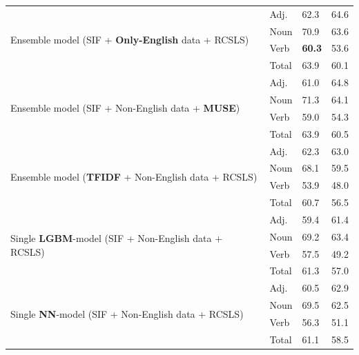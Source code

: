 \documentclass[11pt,a4paper]{article}
\begin{document}
\begin{table}[!htb]
\begin{tabular}{l l l l}
		\hline
		\multirow{4}{*}{Ensemble model (SIF + \textbf{Only-English} data + RCSLS)}
		& \multicolumn{1}{l}{Adj.} & \multicolumn{1}{l}{62.3} & \multicolumn{1}{l}{64.6} \\
		& \multicolumn{1}{l}{Noun} & \multicolumn{1}{l}{70.9} & \multicolumn{1}{l}{63.6} \\
		& \multicolumn{1}{l}{Verb} & \multicolumn{1}{l}{\textbf{60.3}} & \multicolumn{1}{l}{53.6} \\
		& \multicolumn{1}{l}{Total} & \multicolumn{1}{l}{63.9} & \multicolumn{1}{l}{60.1} \\
		\hline
		\multirow{4}{*}{Ensemble model (SIF + Non-English data + \textbf{MUSE})}
		& \multicolumn{1}{l}{Adj.} & \multicolumn{1}{l}{61.0} & \multicolumn{1}{l}{64.8} \\
		& \multicolumn{1}{l}{Noun} & \multicolumn{1}{l}{71.3} & \multicolumn{1}{l}{64.1} \\
		& \multicolumn{1}{l}{Verb} & \multicolumn{1}{l}{59.0} & \multicolumn{1}{l}{54.3} \\
		& \multicolumn{1}{l}{Total} & \multicolumn{1}{l}{63.9} & \multicolumn{1}{l}{60.5} \\
		\hline
		\multirow{4}{*}{Ensemble model (\textbf{TFIDF} + Non-English data + RCSLS)}
		& \multicolumn{1}{l}{Adj.} & \multicolumn{1}{l}{62.3} & \multicolumn{1}{l}{63.0} \\
		& \multicolumn{1}{l}{Noun} & \multicolumn{1}{l}{68.1} & \multicolumn{1}{l}{59.5} \\
		& \multicolumn{1}{l}{Verb} & \multicolumn{1}{l}{53.9} & \multicolumn{1}{l}{48.0} \\
		& \multicolumn{1}{l}{Total} & \multicolumn{1}{l}{60.7} & \multicolumn{1}{l}{56.5} \\
		\hline
		\multirow{4}{*}{Single \textbf{LGBM}-model (SIF + Non-English data + RCSLS)}
		& \multicolumn{1}{l}{Adj.} & \multicolumn{1}{l}{59.4} & \multicolumn{1}{l}{61.4} \\
		& \multicolumn{1}{l}{Noun} & \multicolumn{1}{l}{69.2} & \multicolumn{1}{l}{63.4} \\
		& \multicolumn{1}{l}{Verb} & \multicolumn{1}{l}{57.5} & \multicolumn{1}{l}{49.2} \\
		& \multicolumn{1}{l}{Total} & \multicolumn{1}{l}{61.3} & \multicolumn{1}{l}{57.0} \\
		
		\hline
		\multirow{4}{*}{Single \textbf{NN}-model (SIF + Non-English data + RCSLS)}
		& \multicolumn{1}{l}{Adj.} & \multicolumn{1}{l}{60.5} & \multicolumn{1}{l}{62.9} \\
		& \multicolumn{1}{l}{Noun} & \multicolumn{1}{l}{69.5} & \multicolumn{1}{l}{62.5} \\
		& \multicolumn{1}{l}{Verb} & \multicolumn{1}{l}{56.3} & \multicolumn{1}{l}{51.1} \\
		& \multicolumn{1}{l}{Total} & \multicolumn{1}{l}{61.1} & \multicolumn{1}{l}{58.5} \\
		
	\end{tabular}
	
\end{table}
\end{document}
